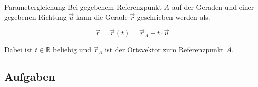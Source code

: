 \begin{definition}{Parametergleichung}{}
  Bei gegebenem Referenzpunkt $A$ auf der Geraden und einer gegebenen
  Richtung $\vec{u}$ kann die Gerade $\vec{r}$ geschrieben werden als.
  
  $$\vec{r} = \vec{r}(t) = \vec{r}_A + t\cdot{} \vec{u}$$

  Dabei ist $t\in\mathbb{R}$ beliebig und $\vec{r}_A$ ist der
  Ortsvektor zum Referenzpunkt $A$.
\end{definition}

\subsection*{Aufgaben}


\newpage%
